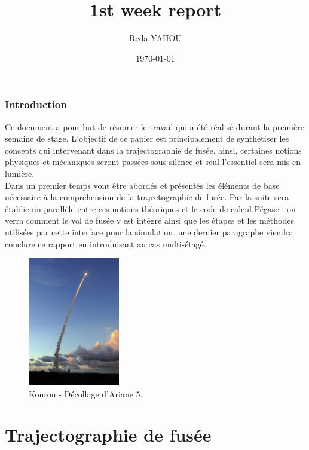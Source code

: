 \documentclass[a4paper]{article}
\title{1st week report}
\author{Reda YAHOU}
\date{\today}
\begin{document}
\maketitle

\section*{Introduction}

Ce document a pour but de résumer le travail qui a été réalisé durant la première semaine de stage. L'objectif de ce papier est principalement de synthétiser les concepts qui intervenant dans la trajectographie de fusée, ainsi, certaines notions physiques et mécaniques seront passées sous silence et seul l'essentiel sera mis en lumière.\\

Dans un premier temps vont être abordés et présentés les éléments de base nécessaire à la compréhension de la trajectographie de fusée. Par la suite sera établie un parallèle entre ces notions théoriques et le code de calcul Pégase : on verra comment le vol de fusée y est intégré ainsi que les étapes et les méthodes utilisées par cette interface pour la simulation. une dernier paragraphe viendra conclure ce rapport en introduisant au cas multi-étagé.\\


\begin{figure}[!htbp]
\begin{center}
\includegraphics[width=4cm]{pictures/Kourou---Decollage-Ariane-5---V184.jpg} 
\end{center}
\caption{Kourou - Décollage d'Ariane 5.}
\end{figure}



\part{Trajectographie de fusée}
\end{document}
